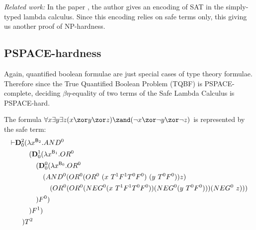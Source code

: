 \emph{Related work:} In the paper  \cite{asperti-np}, the author gives an encoding of SAT in the simply-typed lambda calculus. Since this encoding relies on safe terms only, this giving us another proof of NP-hardness.

\subsection{PSPACE-hardness}
Again, quantified boolean formulae are just special cases of type theory formulae. Therefore since the True Quantified Boolean Problem (TQBF) is PSPACE-complete, deciding $\beta\eta$-equality of two terms of the Safe Lambda Calculus is PSPACE-hard.

%
\begin{example}
  The formula $\forall x \exists y \exists z (x\zor y\zor z)\zand(\neg x\zor \neg y\zor \neg z)$ is represented by the safe term:
\begin{align*}
\vdash &\mathbf{D}_0^2(\lambda x^{\mathsf{B}_2}. AND^0\\
&\quad\quad (\mathbf{D}_0^1(\lambda x^{\mathsf{B}_1}.OR^0\\
&\quad\quad\quad (\mathbf{D}_0^0(\lambda x^{\mathsf{B}_0}.OR^0\\
&\quad\quad\quad\quad (AND^0 (OR^0(OR^0~(x~T^1 F^1 T^0 F^0)~(y~T^0 F^0))z) \\
&\quad\quad\quad\quad\quad (OR^0(OR^0(NEG^0 (x~T^1 F^1 T^0 F^0))(NEG^0 (y~T^0 F^0)))(NEG^0~z))) \\
&\quad\quad\quad )F^0)\\
&\quad\quad)F^1)\\
&\quad) T^2
\end{align*}
\end{example}


